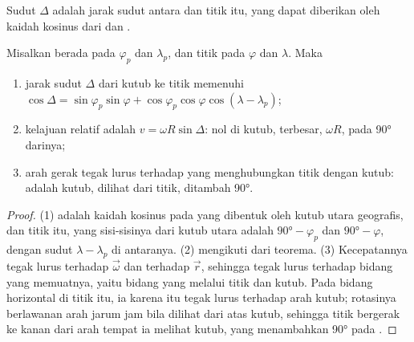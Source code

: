 Sudut $\Delta$ adalah jarak sudut antara  dan titik itu, yang dapat diberikan oleh kaidah kosinus dari  dan .

\begin{proposition}\label{prop:b1:plate-kinematics:speed}
Misalkan  berada pada  $\varphi_p$ dan  $\lambda_p$, dan titik pada $\varphi$ dan $\lambda$. Maka
\begin{enumerate}
  \item jarak sudut $\Delta$ dari kutub ke titik memenuhi
        $\cos\Delta = \sin\varphi_p\sin\varphi + \cos\varphi_p\cos\varphi
        \cos(\lambda - \lambda_p)$;
  \item kelajuan relatif adalah $v = \omega R\sin\Delta$: nol di kutub,
        terbesar, $\omega R$, pada  \ang{90} darinya;
  \item arah gerak tegak lurus terhadap  yang menghubungkan titik dengan kutub:  adalah  kutub, dilihat dari titik, ditambah \ang{90}.
\end{enumerate}
\end{proposition}

\begin{proof}
(1) adalah kaidah kosinus pada  yang dibentuk oleh kutub utara geografis,  dan titik itu, yang sisi-sisinya dari kutub utara adalah
$\ang{90} - \varphi_p$ dan $\ang{90} - \varphi$, dengan sudut $\lambda - \lambda_p$ di antaranya. (2) mengikuti dari teorema. (3) Kecepatannya tegak lurus terhadap $\vec\omega$ dan terhadap $\vec r$, sehingga tegak lurus terhadap bidang yang
memuatnya, yaitu bidang  yang melalui titik dan kutub. Pada bidang horizontal di titik itu, ia karena itu tegak lurus terhadap arah kutub; rotasinya berlawanan arah jarum jam bila dilihat dari atas kutub, sehingga titik bergerak ke kanan dari arah tempat ia melihat kutub, yang menambahkan \ang{90} pada .
\end{proof}

